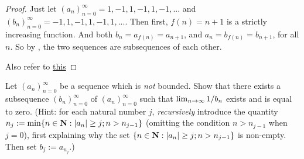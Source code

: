 \begin{proof}
Just let \((a_n)_{n = 0}^{\infty} = 1, -1, 1, -1, 1, -1,...\) and \((b_n)_{n = 0}^{\infty} = -1, 1, -1, 1, -1, 1,...\).
Then first, \(f(n) = n + 1\) is a strictly increasing function.
And both \(b_n = a_{f(n)} = a_{n + 1}\), and \(a_n = b_{f(n)} = b_{n + 1}\), for all \(n\).
So by , the two sequences are subsequences of each other.

Also refer to \href{https://math.stackexchange.com/questions/3677059}{this}
\end{proof}

\begin{exercise} \label{exercise 6.6.3}
Let \((a_n)_{n = 0}^{\infty}\) be a sequence which is \emph{not} bounded.
Show that there exists a subsequence \((b_n)_{n = 0}^{\infty}\) of \((a_n)_{n = 0}^{\infty}\) such that \(\lim_{n \to \infty} 1/b_n\) exists and is equal to zero.
(Hint: for each natural number \(j\), \emph{recursively} introduce the quantity \(n_j := \min\{n \in \mathbf{N} : \lvert a_n\rvert \ge j; n > n_{j - 1}\}\)
(omitting the condition \(n > n_{j - 1}\) when \(j = 0\)), 
first explaining why the set \(\{n \in \mathbf{N} : \lvert a_n\rvert \ge j; n > n_{j - 1}\}\) is non-empty.
Then set \(b_j := a_{n_j}\).)
\end{exercise}

